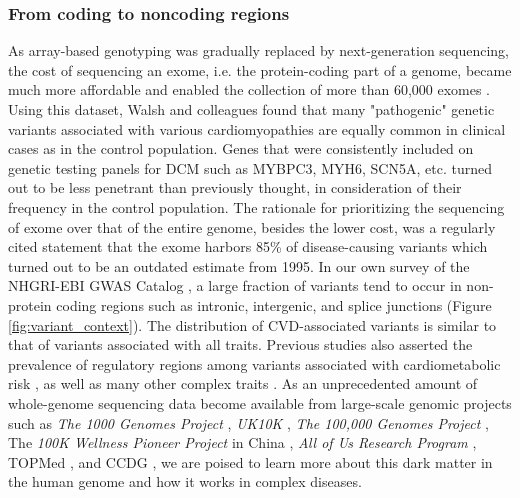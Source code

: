 \documentclass[letter]{bib}
\begin{document}
\subsubsection*{From coding to noncoding regions}	
	As array-based genotyping was gradually replaced by next-generation sequencing, the cost of sequencing an exome, i.e. the protein-coding part of a genome, became much more affordable and enabled the collection of more than 60,000 exomes \citep{Lek:2016:Analysis}. Using this dataset, Walsh and colleagues \cite{Walsh:2017:Reassessment} found that many "pathogenic" genetic variants associated with various cardiomyopathies are equally common in clinical cases as in the control population. Genes that were consistently included on genetic testing panels for DCM such as MYBPC3, MYH6, SCN5A, etc. turned out to be less penetrant than previously thought, in consideration of their frequency in the control population. The rationale for prioritizing the sequencing of exome over that of the entire genome, besides the lower cost, was a regularly cited statement that the exome harbors 85\% of disease-causing variants \citep{Antonarakis:2001:nature} which turned out to be an outdated estimate from 1995. In our own survey of the NHGRI-EBI GWAS Catalog \citep{MacArthur:2017:new}, a large fraction of variants tend to occur in non-protein coding regions such as intronic, intergenic, and splice junctions (Figure \ref{fig:variant_context}). The distribution of CVD-associated variants is similar to that of variants associated with all traits. Previous studies also asserted the prevalence of regulatory regions among variants associated with cardiometabolic risk \citep{Franzen:2016:Cardiometabolic}, as well as many other complex traits \citep{Pickrell:2014:Joint}. As an unprecedented amount of whole-genome sequencing data become available from large-scale genomic projects such as \textit{The 1000 Genomes Project} \citep{1000G:2015:global}, \textit{UK10K} \citep{TheUK10KConsortium:2015:UK10K}, \textit{The 100,000 Genomes Project} \citep{Caulfield:2017:100K}, The \textit{100K Wellness Pioneer Project} in China \citep{Kalia:2017:China}, \textit{All of Us Research Program} \citep{NIH:2018:All}, TOPMed \citep{NHLBI:2014:TransOmics}, and CCDG \citep{NHGRI:2016:CCDG}, we are poised to learn more about this dark matter in the human genome and how it works in complex diseases.
\end{document}
